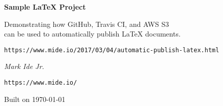 \documentclass[12pt,letterpaper]{report}
\begin{document}
\begin{titlepage}
  \centering
  {\huge\bfseries Sample \LaTeX{} Project\par}
  \vspace{.5in}
  Demonstrating how GitHub, Travis CI, and AWS S3\\
  can be used to automatically publish \LaTeX{} documents.
  \vfill
  {\texttt{https://www.mide.io/2017/03/04/automatic-publish-latex.html}\par}
  \vfill
  {\Large\itshape Mark Ide Jr.\par}
  {\texttt{https://www.mide.io/}\par}
  {\large Built on \today\par}
\end{titlepage}
\end{document}
